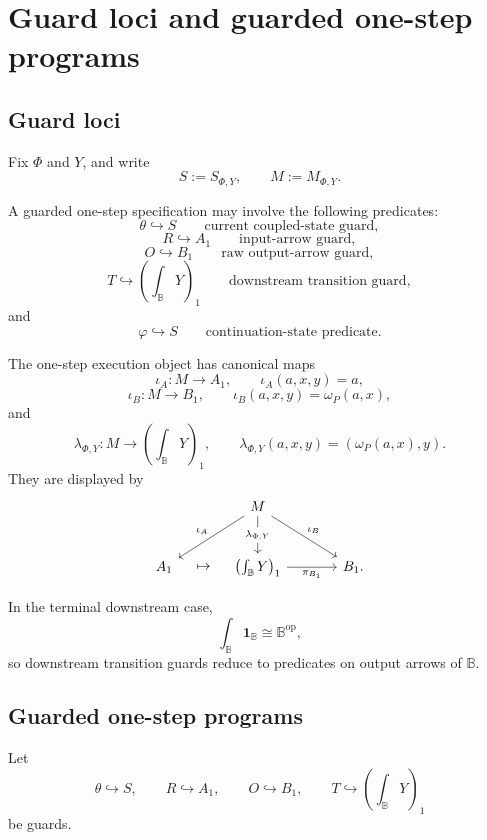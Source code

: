 \section{Guard loci and guarded one-step programs}
\label{sec:poly-relative-guard-loci-primitives}

\subsection{Guard loci}
\label{subsec:poly-relative-guard-loci}

Fix \(\Phi\) and \(Y\), and write
\[
S:=S_{\Phi,Y},
\qquad
M:=M_{\Phi,Y}.
\]

A guarded one-step specification may involve the following predicates:
\[
\theta\hookrightarrow S
\qquad
\text{current coupled-state guard},
\]
\[
R\hookrightarrow A_1
\qquad
\text{input-arrow guard},
\]
\[
O\hookrightarrow B_1
\qquad
\text{raw output-arrow guard},
\]
\[
T\hookrightarrow\left(\int_{\mathbb B}Y\right)_1
\qquad
\text{downstream transition guard},
\]
and
\[
\varphi\hookrightarrow S
\qquad
\text{continuation-state predicate}.
\]

The one-step execution object has canonical maps
\[
\iota_A:M\to A_1,
\qquad
\iota_A(a,x,y)=a,
\]
\[
\iota_B:M\to B_1,
\qquad
\iota_B(a,x,y)=\omega_P(a,x),
\]
and
\[
\lambda_{\Phi,Y}:M\to\left(\int_{\mathbb B}Y\right)_1,
\qquad
\lambda_{\Phi,Y}(a,x,y)=(\omega_P(a,x),y).
\]
They are displayed by
\[
\begin{tikzcd}[column sep=large,row sep=large]
&
M
  \arrow[dl,"\iota_A"']
  \arrow[d,"\lambda_{\Phi,Y}" description]
  \arrow[dr,"\iota_B"]
&
\\
A_1
&
\left(\int_{\mathbb B}Y\right)_1
  \arrow[l,phantom,"\mapsto"]
  \arrow[r,"\pi_{B_1}"']
&
B_1 .
\end{tikzcd}
\]

In the terminal downstream case,
\[
\int_{\mathbb B}\mathbf 1_{\mathbb B}\cong\mathbb B^{\mathrm{op}},
\]
so downstream transition guards reduce to predicates on output arrows of
\(\mathbb B\).

\subsection{Guarded one-step programs}
\label{subsec:poly-relative-guarded-primitives}

Let
\[
\theta\hookrightarrow S,
\qquad
R\hookrightarrow A_1,
\qquad
O\hookrightarrow B_1,
\qquad
T\hookrightarrow\left(\int_{\mathbb B}Y\right)_1
\]
be guards.

